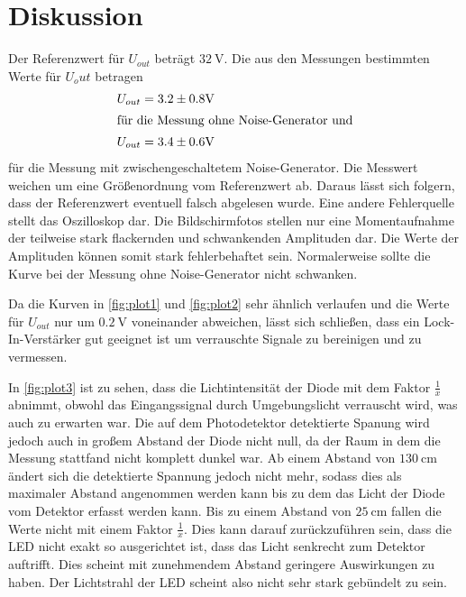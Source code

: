 \section{Diskussion}
\label{sec:Diskussion}

Der Referenzwert für $U_{out}$ beträgt $\qty{32}{\volt}$.
Die aus den Messungen bestimmten Werte für $U_out$ betragen
\begin{align*}
    U_{out} &= 3.2 \pm 0.8 \si{\volt}\\
    \intertext{für die Messung ohne Noise-Generator und}
    U_{out} &= 3.4 \pm 0.6 \si{\volt}
\end{align*}
für die Messung mit zwischengeschaltetem Noise-Generator.
Die Messwert weichen um eine Größenordnung vom Referenzwert ab. Daraus lässt sich folgern, dass der Referenzwert eventuell falsch abgelesen wurde.
Eine andere Fehlerquelle stellt das Oszilloskop dar. Die Bildschirmfotos stellen nur eine Momentaufnahme der teilweise stark flackernden und schwankenden 
Amplituden dar. Die Werte der Amplituden können somit stark fehlerbehaftet sein. Normalerweise sollte die Kurve bei der Messung ohne Noise-Generator nicht
schwanken.

Da die Kurven in \autoref{fig:plot1} und \autoref{fig:plot2} sehr ähnlich verlaufen und die Werte für $U_{out}$ nur um $\qty{0.2}{\volt}$ voneinander abweichen,
lässt sich schließen, dass ein Lock-In-Verstärker gut geeignet ist um verrauschte Signale zu bereinigen und zu vermessen.


In \autoref{fig:plot3} ist zu sehen, dass die Lichtintensität der Diode mit dem Faktor $\frac{1}{x}$ abnimmt, obwohl das Eingangssignal durch Umgebungslicht verrauscht wird, was auch zu erwarten war.
Die auf dem Photodetektor detektierte Spanung wird jedoch auch in großem Abstand der Diode nicht null, da der Raum in dem die Messung stattfand nicht komplett dunkel war.
Ab einem Abstand von $\qty{130}{\centi\meter}$ ändert sich die detektierte Spannung jedoch nicht mehr, sodass dies als maximaler Abstand angenommen werden kann
bis zu dem das Licht der Diode vom Detektor erfasst werden kann.
Bis zu einem Abstand von $\qty{25}{\centi\meter}$ fallen die Werte nicht mit einem Faktor $\frac{1}{x}$. Dies kann darauf zurückzuführen sein,
dass die LED nicht exakt so ausgerichtet ist, dass das Licht senkrecht zum Detektor auftrifft. Dies scheint mit zunehmendem Abstand geringere Auswirkungen
zu haben. Der Lichtstrahl der LED scheint also nicht sehr stark gebündelt zu sein.
